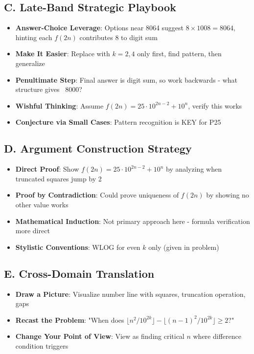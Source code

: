 \documentclass[]{article}
\begin{document}
\begin{strategicbox}
\subsection*{C. Late-Band Strategic Playbook}
\begin{itemize}[leftmargin=*]
    \item \textbf{Answer-Choice Leverage}: Options near 8064 suggest $8 \times 1008 = 8064$, hinting each $f(2n)$ contributes 8 to digit sum
    \item \textbf{Make It Easier}: Replace with $k=2,4$ only first, find pattern, then generalize
    \item \textbf{Penultimate Step}: Final answer is digit sum, so work backwards - what structure gives ~8000?
    \item \textbf{Wishful Thinking}: Assume $f(2n) = 25 \cdot 10^{2n-2} + 10^n$, verify this works
    \item \textbf{Conjecture via Small Cases}: Pattern recognition is KEY for P25
\end{itemize}

\subsection*{D. Argument Construction Strategy}
\begin{itemize}[leftmargin=*]
    \item \textbf{Direct Proof}: Show $f(2n) = 25 \cdot 10^{2n-2} + 10^n$ by analyzing when truncated squares jump by 2
    \item \textbf{Proof by Contradiction}: Could prove uniqueness of $f(2n)$ by showing no other value works
    \item \textbf{Mathematical Induction}: Not primary approach here - formula verification more direct
    \item \textbf{Stylistic Conventions}: WLOG for even $k$ only (given in problem)
\end{itemize}

\subsection*{E. Cross-Domain Translation}
\begin{itemize}[leftmargin=*]
    \item \textbf{Draw a Picture}: Visualize number line with squares, truncation operation, gaps
    \item \textbf{Recast the Problem}: "When does $\lfloor n^2/10^{2k} \rfloor - \lfloor (n-1)^2/10^{2k} \rfloor \geq 2$?"
    \item \textbf{Change Your Point of View}: View as finding critical $n$ where difference condition triggers
\end{itemize}
\end{strategicbox}
\end{document}
